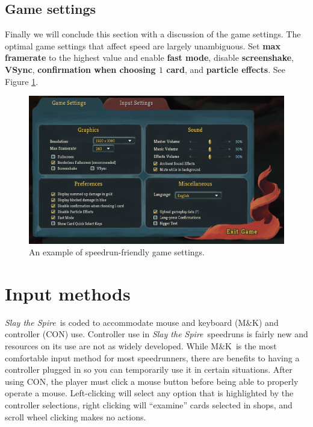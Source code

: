 \documentclass[12pt]{amsart}
\newcommand{\mk}{\textsf{M\&K}}
\newcommand{\con}{\textsf{CON}}
\newcommand{\sts}{\textit{Slay the Spire}}
\begin{document}
\subsection{Game settings}
Finally we will conclude this section with a discussion of the game settings.  
The optimal game settings that affect speed are largely unambiguous.  
Set \textbf{max framerate} to the highest value and enable \textbf{fast mode}, disable \textbf{screenshake}, \textbf{VSync}, \textbf{confirmation when choosing $1$ card}, and \textbf{particle effects}.  
See Figure \ref{fig: game settings}.  
\begin{figure}[h]
    \centering
    \includegraphics[scale=.25]{graphics/GameSettings.PNG}
    \caption{An example of speedrun-friendly game settings.  }
    \label{fig: game settings}
\end{figure}

\section{Input methods}\label{sec: input methods}
\sts~is coded to accommodate mouse and keyboard (\mk) and controller (\con) use.  
Controller use in \sts~speedruns is fairly new and resources on its use are not as widely developed.  
While \mk~is the most comfortable input method for most speedrunners, there are benefits to having a controller plugged in so you can temporarily use it in certain situations.  
After using \con, the player must click a mouse button before being able to properly operate a mouse.  
Left-clicking will select any option that is highlighted by the controller selections, right clicking will ``examine'' cards selected in shops, and scroll wheel clicking makes no actions.  
\\
\end{document}
